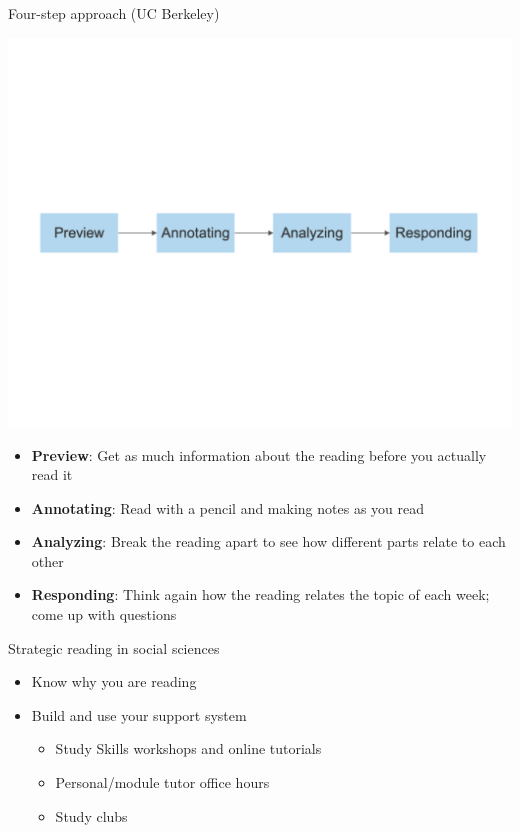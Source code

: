 \documentclass[
  10pt,
  ignorenonframetext,
]{beamer}
\begin{document}
\begin{frame}{Four-step approach (UC Berkeley)}
\protect\hypertarget{four-step-approach-uc-berkeley}{}
\vspace{0.2cm}

\begin{center}\includegraphics[width=1\linewidth]{Figs/ucb} \end{center}
\vspace{0.5cm}
\begin{itemize}
  \item \textbf{Preview}: Get as much information about the reading before you actually read it
  \vspace{0.1cm}
  \item \textbf{Annotating}: Read with a pencil and making notes as you read
  \vspace{0.1cm}
  \item \textbf{Analyzing}: Break the reading apart to see how different parts relate to each other
  \vspace{0.1cm}
  \item \textbf{Responding}: Think again how the reading relates the topic of each week; come up with questions
\end{itemize}
\end{frame}

\begin{frame}{Strategic reading in social sciences}
\protect\hypertarget{strategic-reading-in-social-sciences-1}{}
\begin{itemize}
  \item Know why you are reading
  \vspace{0.5cm}
  \item Build and use your support system
  \vspace{0.1cm}
  \begin{itemize}
    \item Study Skills workshops and online tutorials
    \item Personal/module tutor office hours
    \item Study clubs
  \end{itemize}
\end{itemize}
\end{frame}
\end{document}
